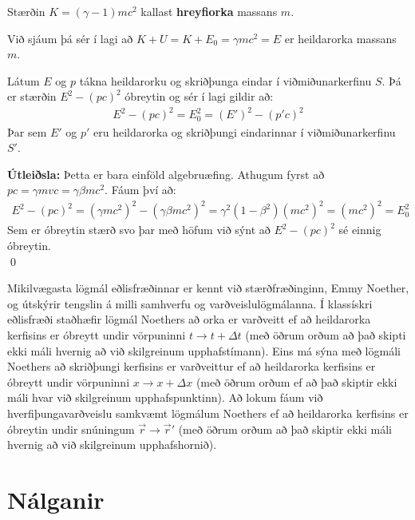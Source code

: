 \begin{tcolorbox}
\begin{definition}
    Stærðin $K = (\gamma -1)mc^2$ kallast \textbf{hreyfiorka} massans $m$.
\end{definition}
\end{tcolorbox}
Við sjáum þá sér í lagi að $K + U = K + E_0 = \gamma mc^2 = E$ er heildarorka massans $m$.

\begin{tcolorbox}
\begin{theorem}
Látum $E$ og $p$ tákna heildarorku og skriðþunga eindar í viðmiðunarkerfinu $S$. Þá er stærðin $E^2 - (pc)^2$ óbreytin og sér í lagi gildir að:
\begin{align*}
E^2 - (pc)^2 = E_0^2 = (E')^2 - (p'c)^2
\end{align*}
Þar sem $E'$ og $p'$ eru heildarorka og skriðþungi eindarinnar í viðmiðunarkerfinu $S'$.
\end{theorem}
\end{tcolorbox}

\textbf{Útleiðsla:} Þetta er bara einföld algebruæfing. Athugum fyrst að $pc = \gamma mvc = \gamma \beta mc^2$. Fáum því að:
\begin{align*}
    E^2 - (pc)^2 = \left(\gamma mc^2 \right)^2 - (\gamma \beta mc^2)^2 = \gamma^2 \left( 1 - \beta^2\right)(mc^2)^2 = (mc^2)^2 = E_0^2
\end{align*}
Sem er óbreytin stærð svo þar með höfum við sýnt að $E^2 - (pc)^2$ sé einnig óbreytin. \\ \qed

Mikilvægasta lögmál eðlisfræðinnar er kennt við stærðfræðinginn, Emmy Noether, og útskýrir tengslin á milli samhverfu og varðveislulögmálanna. Í klassískri eðlisfræði staðhæfir lögmál Noethers að orka er varðveitt ef að heildarorka kerfisins er óbreytt undir vörpuninni $t \to t + \Delta t$ (með öðrum orðum að það skipti ekki máli hvernig að við skilgreinum upphafstímann). Eins má sýna með lögmáli Noethers að skriðþungi kerfisins er varðveittur ef að heildarorka kerfisins er óbreytt undir vörpuninni $x \to x + \Delta x$ (með öðrum orðum ef að það skiptir ekki máli hvar við skilgreinum upphafspunktinn). Að lokum fáum við hverfiþungavarðveislu samkvæmt lögmálum Noethers ef að heildarorka kerfisins er óbreytin undir snúningum $\Vec{r} \to \Vec{r}'$ (með öðrum orðum að það skiptir ekki máli hvernig að við skilgreinum upphafshornið).

\newpage


\section{Nálganir}

